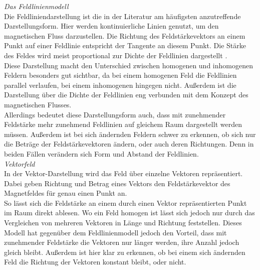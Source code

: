\textit{Das Feldlinienmodell}\\
Die Feldliniendarstellung ist die in der Literatur am häufigsten anzutreffende Darstellungsform. Hier werden kontinuierliche Linien genutzt, um den magnetischen Fluss darzustellen. Die Richtung des Feldstärkevektors an einem Punkt auf einer Feldlinie entspricht der Tangente an diesem Punkt. Die Stärke des Feldes wird meist proportional zur Dichte der Feldlinien dargestellt \cite{Kilian03}.\\

Diese Darstellung macht den Unterschied zwischen homogenen und inhomogenen Feldern besonders gut sichtbar, da bei einem homogenen Feld die Feldlinien parallel verlaufen, bei einem inhomogenen hingegen nicht. Außerdem ist die Darstellung über die Dichte der Feldlinien eng verbunden mit dem Konzept des magnetischen Flusses.\\

Allerdings bedeutet diese Darstellungsform auch, dass mit zunehmender Feldstärke mehr zunehmend Feldlinien auf gleichem Raum dargestellt werden müssen. Außerdem ist bei sich ändernden Feldern schwer zu erkennen, ob sich nur die Beträge der Feldstärkevektoren ändern, oder auch deren Richtungen. Denn in beiden Fällen verändern sich Form und Abstand der Feldlinien.\\

\textit{Vektorfeld}\\
In der Vektor-Darstellung wird das Feld über einzelne Vektoren repräsentiert. Dabei geben Richtung und Betrag eines Vektors den Feldstärkevektor des Magnetfeldes für genau einen Punkt an.\\
So lässt sich die Feldstärke an einem durch einen Vektor repräsentierten Punkt im Raum direkt ablesen. Wo ein Feld homogen ist lässt sich jedoch nur durch das Vergleichen von mehreren Vektoren in Länge und Richtung feststellen. Dieses Modell hat gegenüber dem Feldlinienmodell jedoch den Vorteil, dass mit zunehmender Feldstärke die Vektoren nur länger werden, ihre Anzahl jedoch gleich bleibt. Außerdem ist hier klar zu erkennen, ob bei einem sich ändernden Feld die Richtung der Vektoren konstant bleibt, oder nicht.

